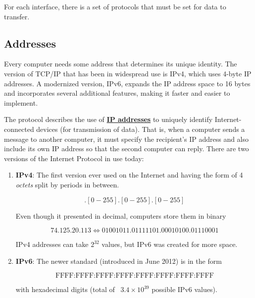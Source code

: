 \documentclass{article}
\newcounter{definition}[section]
\begin{document}
    For each interface, there is a set of protocols that must be set for data to transfer. 

  \subsection{Addresses}

    Every computer needs some address that determines its unique identity. The version of TCP/IP that has been in widespread use is IPv4, which uses 4-byte IP addresses. A modernized version, IPv6, expands the IP address space to 16 bytes and incorporates several additional features, making it faster and easier to implement. 

    \begin{definition}[IP Address]
      \label{def:ip-address}
      The protocol describes the use of \textbf{\hyperref[def:ip-addresses]{IP addresses}} to uniquely identify Internet-connected devices (for transmission of data). That is, when a computer sends a message to another computer, it must specify the recipient's IP address and also include its own IP address so that the second computer can reply. There are two versions of the Internet Protocol in use today: 
      \begin{enumerate}
          \item \textbf{IPv4}: The first version ever used on the Internet and having the form of 4 \textit{octets} split by periods in between. 

            \begin{equation}
              [0-255].[0-255].[0-255].[0-255]
            \end{equation}

          Even though it presented in decimal, computers store them in binary 

            \begin{equation}
              74.125.20.113 \iff 01001011.01111101.00010100.01110001
            \end{equation}

          IPv4 addresses can take $2^{32}$ values, but IPv6 was created for more space.

          \item \textbf{IPv6}: The newer standard (introduced in June 2012) is in the form 

            \begin{equation}
              \text{FFFF:FFFF:FFFF:FFFF:FFFF:FFFF:FFFF:FFFF}
            \end{equation}

          with hexadecimal digits (total of ~$3.4 \times 10^{39}$ possible IPv6 values). 
      \end{enumerate}
    \end{definition}
\end{document}
